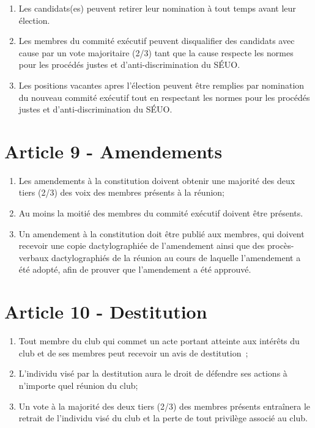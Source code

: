 \begin{enumerate}
\begin{enumerate}
        \item Le/la candidat(e) avec le plus de votes sera élu(e).
        \item Les égalités seront déterminées par une vote majoritaire (2/3)
            des exécutifs(ves) précédents(es) tout en respectant les normes
            pour les procédés justes et d'anti-discrimination du SÉUO.
        \item Après ces procédés, les résultats des élections seront publiés
    \end{enumerate}
    \item Les candidats(es) peuvent retirer leur nomination à tout temps avant leur élection.
    \item Les membres du commité exécutif peuvent disqualifier des candidats
        avec cause par un vote majoritaire (2/3) tant que la cause respecte les
        normes pour les procédés justes et d'anti-discrimination du SÉUO.
    \item Les positions vacantes apres l'élection peuvent être remplies par nomination du nouveau commité exécutif tout en respectant les normes
            pour les procédés justes et d'anti-discrimination du SÉUO.

\end{enumerate}

\section*{Article 9 - Amendements}

\begin{enumerate}
    \item Les amendements à la constitution doivent obtenir une majorité des deux tiers (2/3)
          des voix des membres présents à la réunion;
    \item Au moins la moitié des membres du commité exécutif doivent être présents.
    \item Un amendement à la constitution doit être publié aux membres, qui
          doivent recevoir une copie dactylographiée de l'amendement ainsi que des
          procès-verbaux dactylographiés de la réunion au cours de laquelle l'amendement
          a été adopté, afin de prouver que l'amendement a été approuvé.
\end{enumerate}

\section*{Article 10 - Destitution}
\begin{enumerate}
    \item Tout membre du club qui commet un acte portant atteinte aux
        intérêts du club et de ses membres peut recevoir un avis de
        destitution~;
    \item L'individu visé par la destitution aura le droit de défendre ses
        actions à n'importe quel réunion du club;
    \item Un vote à la majorité des deux tiers (2/3) des membres présents entraînera
        le retrait de l'individu visé du club et la perte
        de tout privilège associé au club.
\end{enumerate}

